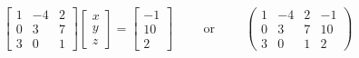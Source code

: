 \begin{align}
\begin{bmatrix}
1 & -4 & 2 \\
0 & 3 & 7 \\
3 & 0 & 1
\end{bmatrix}
\begin{bmatrix}
x \\
y \\
z
\end{bmatrix}
=
\begin{bmatrix}
-1 \\
10 \\
2
\end{bmatrix} 
\hspace{1cm} \text{or} \hspace{1cm} 
\left(
\begin{array}{ccc|c}
1 & -4 & 2 & -1 \\
0 & 3 & 7 & 10\\
3 & 0 & 1 & 2
\end{array}
\right)
\end{align}



